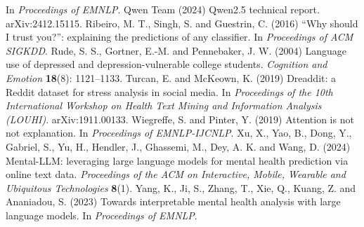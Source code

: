 \begin{thebibliography}{}
 In {\it Proceedings of EMNLP}.
 Qwen Team (2024) Qwen2.5 technical report. arXiv:2412.15115.
 Ribeiro, M. T., Singh, S. and Guestrin, C. (2016) ``Why should I trust you?'': explaining the
 predictions of any classifier. In {\it Proceedings of ACM SIGKDD}.
 Rude, S. S., Gortner, E.-M. and Pennebaker, J. W. (2004) Language use of depressed and
 depression-vulnerable college students. {\it Cognition and Emotion} {\bf 18}(8): 1121--1133.
 Turcan, E. and McKeown, K. (2019) Dreaddit: a Reddit dataset for stress analysis in social media.
 In {\it Proceedings of the 10th International Workshop on Health Text Mining and Information
 Analysis (LOUHI)}. arXiv:1911.00133.
 Wiegreffe, S. and Pinter, Y. (2019) Attention is not not explanation. In {\it Proceedings of
 EMNLP-IJCNLP}.
 Xu, X., Yao, B., Dong, Y., Gabriel, S., Yu, H., Hendler, J., Ghassemi, M., Dey, A. K. and Wang, D.
 (2024) Mental-LLM: leveraging large language models for mental health prediction via online text
 data. {\it Proceedings of the ACM on Interactive, Mobile, Wearable and Ubiquitous Technologies} {\bf 8}(1).
 Yang, K., Ji, S., Zhang, T., Xie, Q., Kuang, Z. and Ananiadou, S. (2023) Towards interpretable mental
 health analysis with large language models. In {\it Proceedings of EMNLP}.
\end{thebibliography}

\label{lastpage}

